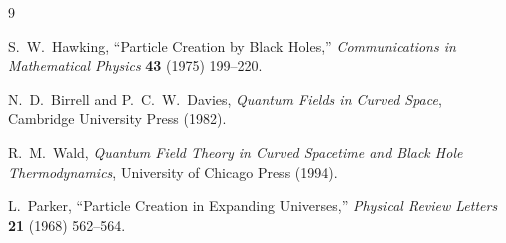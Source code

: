 \documentclass[11pt,a4paper]{article}
\begin{document}
\begin{thebibliography}{9}

S.~W.~Hawking,
``Particle Creation by Black Holes,''
\emph{Communications in Mathematical Physics} \textbf{43} (1975) 199--220.

N.~D.~Birrell and P.~C.~W.~Davies,
\emph{Quantum Fields in Curved Space},
Cambridge University Press (1982).

R.~M.~Wald,
\emph{Quantum Field Theory in Curved Spacetime and Black Hole Thermodynamics},
University of Chicago Press (1994).

L.~Parker,
``Particle Creation in Expanding Universes,''
\emph{Physical Review Letters} \textbf{21} (1968) 562--564.
\end{thebibliography}
\end{document}
